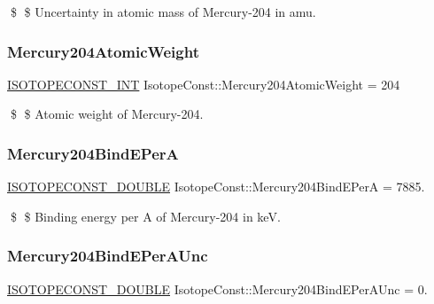 \$ \$ Uncertainty in atomic mass of Mercury-\/204 in amu. \mbox{\label{group___isotope_const-_mercury-_hg204_ga12c71f3db8a6a1a6bec8277fc08cbe9c}} 
\subsubsection{\texorpdfstring{Mercury204\+Atomic\+Weight}{Mercury204AtomicWeight}}
{\footnotesize\ttfamily \mbox{\hyperlink{group___isotope_const-_macros_ga5f18360b3e99483a35c32d789e62621c}{I\+S\+O\+T\+O\+P\+E\+C\+O\+N\+S\+T\+\_\+\+I\+NT}} Isotope\+Const\+::\+Mercury204\+Atomic\+Weight = 204}

\$ \$ Atomic weight of Mercury-\/204. \mbox{\label{group___isotope_const-_mercury-_hg204_gaa4fa27bce19caf56cdc23d9ac38f5149}} 
\subsubsection{\texorpdfstring{Mercury204\+Bind\+E\+PerA}{Mercury204BindEPerA}}
{\footnotesize\ttfamily \mbox{\hyperlink{group___isotope_const-_macros_ga8f45a7272ce02c0b4c65c44636ed719a}{I\+S\+O\+T\+O\+P\+E\+C\+O\+N\+S\+T\+\_\+\+D\+O\+U\+B\+LE}} Isotope\+Const\+::\+Mercury204\+Bind\+E\+PerA = 7885.}

\$ \$ Binding energy per A of Mercury-\/204 in keV. \mbox{\label{group___isotope_const-_mercury-_hg204_ga736856f7ae57c93554872258844633b4}} 
\subsubsection{\texorpdfstring{Mercury204\+Bind\+E\+Per\+A\+Unc}{Mercury204BindEPerAUnc}}
{\footnotesize\ttfamily \mbox{\hyperlink{group___isotope_const-_macros_ga8f45a7272ce02c0b4c65c44636ed719a}{I\+S\+O\+T\+O\+P\+E\+C\+O\+N\+S\+T\+\_\+\+D\+O\+U\+B\+LE}} Isotope\+Const\+::\+Mercury204\+Bind\+E\+Per\+A\+Unc = 0.}

